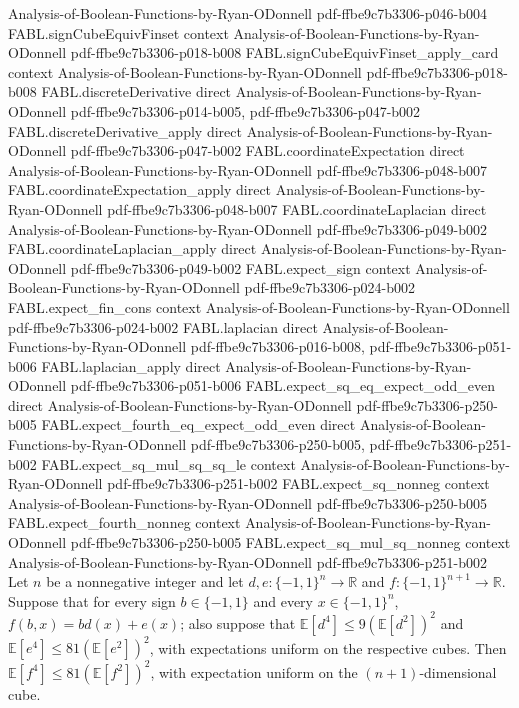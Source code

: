 \begin{theorem}
  {Analysis-of-Boolean-Functions-by-Ryan-ODonnell}
  {pdf-ffbe9c7b3306-p046-b004}
\proofstep
  {FABL.signCubeEquivFinset}
  {context}
  {Analysis-of-Boolean-Functions-by-Ryan-ODonnell}
  {pdf-ffbe9c7b3306-p018-b008}
\proofstep
  {FABL.signCubeEquivFinset_apply_card}
  {context}
  {Analysis-of-Boolean-Functions-by-Ryan-ODonnell}
  {pdf-ffbe9c7b3306-p018-b008}
\proofstep
  {FABL.discreteDerivative}
  {direct}
  {Analysis-of-Boolean-Functions-by-Ryan-ODonnell}
  {pdf-ffbe9c7b3306-p014-b005,
    pdf-ffbe9c7b3306-p047-b002}
\proofstep
  {FABL.discreteDerivative_apply}
  {direct}
  {Analysis-of-Boolean-Functions-by-Ryan-ODonnell}
  {pdf-ffbe9c7b3306-p047-b002}
\proofstep
  {FABL.coordinateExpectation}
  {direct}
  {Analysis-of-Boolean-Functions-by-Ryan-ODonnell}
  {pdf-ffbe9c7b3306-p048-b007}
\proofstep
  {FABL.coordinateExpectation_apply}
  {direct}
  {Analysis-of-Boolean-Functions-by-Ryan-ODonnell}
  {pdf-ffbe9c7b3306-p048-b007}
\proofstep
  {FABL.coordinateLaplacian}
  {direct}
  {Analysis-of-Boolean-Functions-by-Ryan-ODonnell}
  {pdf-ffbe9c7b3306-p049-b002}
\proofstep
  {FABL.coordinateLaplacian_apply}
  {direct}
  {Analysis-of-Boolean-Functions-by-Ryan-ODonnell}
  {pdf-ffbe9c7b3306-p049-b002}
\proofstep
  {FABL.expect_sign}
  {context}
  {Analysis-of-Boolean-Functions-by-Ryan-ODonnell}
  {pdf-ffbe9c7b3306-p024-b002}
\proofstep
  {FABL.expect_fin_cons}
  {context}
  {Analysis-of-Boolean-Functions-by-Ryan-ODonnell}
  {pdf-ffbe9c7b3306-p024-b002}
\proofstep
  {FABL.laplacian}
  {direct}
  {Analysis-of-Boolean-Functions-by-Ryan-ODonnell}
  {pdf-ffbe9c7b3306-p016-b008,
    pdf-ffbe9c7b3306-p051-b006}
\proofstep
  {FABL.laplacian_apply}
  {direct}
  {Analysis-of-Boolean-Functions-by-Ryan-ODonnell}
  {pdf-ffbe9c7b3306-p051-b006}
\proofstep
  {FABL.expect_sq_eq_expect_odd_even}
  {direct}
  {Analysis-of-Boolean-Functions-by-Ryan-ODonnell}
  {pdf-ffbe9c7b3306-p250-b005}
\proofstep
  {FABL.expect_fourth_eq_expect_odd_even}
  {direct}
  {Analysis-of-Boolean-Functions-by-Ryan-ODonnell}
  {pdf-ffbe9c7b3306-p250-b005,
    pdf-ffbe9c7b3306-p251-b002}
\proofstep
  {FABL.expect_sq_mul_sq_sq_le}
  {context}
  {Analysis-of-Boolean-Functions-by-Ryan-ODonnell}
  {pdf-ffbe9c7b3306-p251-b002}
\proofstep
  {FABL.expect_sq_nonneg}
  {context}
  {Analysis-of-Boolean-Functions-by-Ryan-ODonnell}
  {pdf-ffbe9c7b3306-p250-b005}
\proofstep
  {FABL.expect_fourth_nonneg}
  {context}
  {Analysis-of-Boolean-Functions-by-Ryan-ODonnell}
  {pdf-ffbe9c7b3306-p250-b005}
\proofstep
  {FABL.expect_sq_mul_sq_nonneg}
  {context}
  {Analysis-of-Boolean-Functions-by-Ryan-ODonnell}
  {pdf-ffbe9c7b3306-p251-b002}
Let $n$ be a nonnegative integer and let $d,e:\{-1,1\}^n\to\mathbb R$ and
$f:\{-1,1\}^{n+1}\to\mathbb R$. Suppose that for every sign $b\in\{-1,1\}$ and every
$x\in\{-1,1\}^n$, $f(b,x)=bd(x)+e(x)$; also suppose that $\mathbb E[d^4]\le 9(\mathbb
E[d^2])^2$ and $\mathbb E[e^4]\le 81(\mathbb E[e^2])^2$, with expectations uniform on
the respective cubes. Then $\mathbb E[f^4]\le 81(\mathbb E[f^2])^2$, with expectation
uniform on the $(n+1)$-dimensional cube.
\end{theorem}

